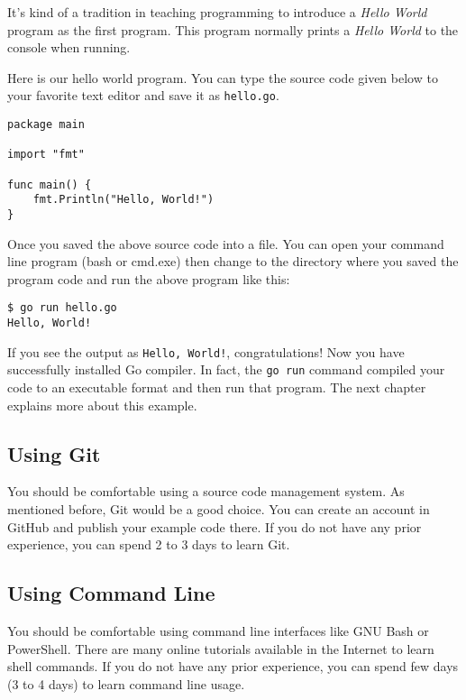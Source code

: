 It's kind of a tradition in teaching programming to introduce a \textit{Hello
World} program as the first program. This program normally prints
a \textit{Hello World} to the console when running.

Here is our hello world program. You can type the source code given below to
your favorite text editor and save it as \texttt{hello.go}.

\begin{lstlisting}[caption=Hello World! (hello.go)]
package main

import "fmt"

func main() {
	fmt.Println("Hello, World!")
}
\end{lstlisting}

Once you saved the above source code into a file. You can open your command line
program (bash or cmd.exe) then change to the directory where you saved the
program code and run the above program like this:

\begin{lstlisting}[numbers=none]
$ go run hello.go
Hello, World!
\end{lstlisting}

If you see the output as \texttt{Hello, World!}, congratulations! Now you have
successfully installed Go compiler. In fact, the \texttt{go run} command
compiled your code to an executable format and then run that program. The next
chapter explains more about this example.

\subsection{Using Git}

You should be comfortable using a source code management system. As mentioned
before, Git would be a good choice. You can create an account in
GitHub and publish your example code there. If you do not have any prior
experience, you can spend 2 to 3 days to learn Git.

\subsection{Using Command Line}

You should be comfortable using command line interfaces like
GNU Bash or PowerShell. There are many online tutorials available in the
Internet to learn shell commands. If you do not have any prior experience, you
can spend few days (3 to 4 days) to learn command line usage.

